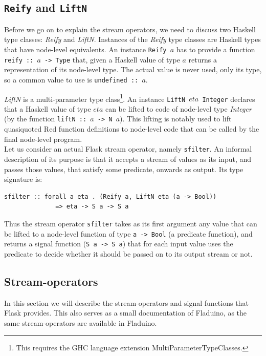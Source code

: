 \documentclass[a4paper, oneside, final]{memoir}
\begin{document}
\subsection{\texttt{Reify} and \texttt{LiftN}}
Before we go on to explain the stream operators, we need to discuss
two Haskell type classes: \textit{Reify} and \textit{LiftN}.
Instances of the \textit{Reify} type classes are Haskell types that
have node-level equivalents. An instance \texttt{Reify $a$} has to
provide a function \texttt{reify :: $a$ -> Type} that, given a Haskell
value of type $a$ returns a representation of its node-level type.
The actual value is never used, only its type, so a common value to
use is \texttt{undefined :: $a$}. \hfill

\textit{LiftN} is a multi-parameter type class\footnote{This requires
  the GHC language extension MultiParameterTypeClasses.}. An instance
\texttt{LiftN $eta$ Integer} declares that a Haskell value of type
$eta$ can be lifted to code of node-level type \textit{Integer} (by
the function \texttt{liftN :: $a$ -> N $a$}).  This lifting is notably
used to lift quasiquoted Red function definitions to
node-level code that can be called by the final node-level program.\\

\noindent
Let us consider an actual Flask stream operator, namely
\texttt{sfilter}. An informal description of its purpose is that it
accepts a stream of values as its input, and passes those values, that
satisfy some predicate, onwards as output.  Its type signature is:

\begin{verbatim}
sfilter :: forall a eta . (Reify a, LiftN eta (a -> Bool))
              => eta -> S a -> S a
\end{verbatim}

Thus the stream operator \texttt{sfilter} takes as its first argument
any value that can be lifted to a node-level function of type
\texttt{a -> Bool} (a predicate function), and returns a signal
function (\texttt{S a -> S a}) that for each input value uses the
predicate to decide whether it should be passed on to its output
stream or not.


\subsection{Stream-operators}
\label{sec:streamoperators}
In this section we will describe the stream-operators and signal
functions that Flask provides. This also serves as a small
documentation of Fladuino, as the same stream-operators are available
in Fladuino.
\end{document}
